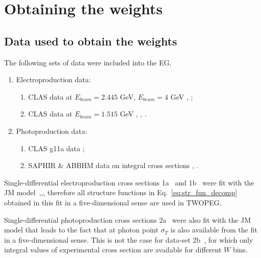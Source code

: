 \chapter{Obtaining the weights}
\label{sect:data}
\section{Data used to obtain the weights}
\mbox{}\vspace{-\baselineskip}

The following sets of data were included into the EG.

\begin{enumerate}
\item Electroproduction data:
\begin{enumerate}
\item CLAS data at $E_{beam} = 2.445$ GeV,  $E_{beam} = 4$ GeV \cite{Ripani:2002ss}, \cite{Mokeev:2015lda};
\item CLAS data at $E_{beam} = 1.515$ GeV \cite{Fedotov:2008aa}, \cite{Mokeev:2008iw}, \cite{Mokeev:2012vsa}.
\end{enumerate}
\item Photoproduction data:
\begin{enumerate}
\item CLAS g11a data \cite{Golovach:note};
\item SAPHIR \& ABBHM data on integral cross sections \cite{Wu:2005wf}, \cite{ABBHHM:1968aa}.  
\end{enumerate}
\end{enumerate}

Single-differential electroproduction cross sections 1a~\cite{Ripani:2002ss} and 1b~\cite{Fedotov:2008aa} were fit with the JM model~\cite{Mokeev:2015lda},\cite{Mokeev:2008iw},\cite{Mokeev:2012vsa}, therefore all structure functions in Eq.~\eqref{eq:str_fun_decomp} obtained in this fit in a five-dimensional sense are used in TWOPEG.

Single-differential photoproduction cross sections 2a~\cite{Golovach:note} were also fit with the JM model that leads to the fact that at photon point $\sigma_{T}$ is also available from the fit in a five-dimensional sense. This is not the case for data-set 2b~\cite{Wu:2005wf}, for which only integral values of experimental cross section are available for different $W$ bins.

